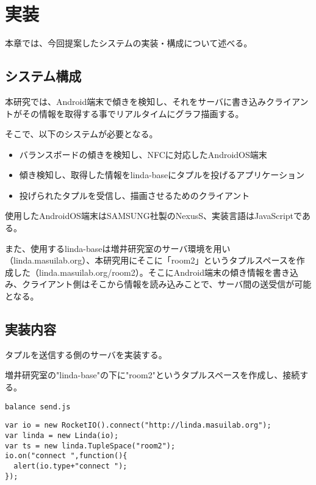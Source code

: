 \chapter{実装}
\label{chap:05}

本章では、今回提案したシステムの実装・構成について述べる。

\section{システム構成}

本研究では、Android端末で傾きを検知し、それをサーバに書き込みクライアントがその情報を取得する事でリアルタイムにグラフ描画する。

そこで、以下のシステムが必要となる。
\begin{itemize}
   \item バランスボードの傾きを検知し、NFCに対応したAndroidOS端末
   \item 傾き検知し、取得した情報をlinda-baseにタプルを投げるアプリケーション
   \item 投げられたタプルを受信し、描画させるためのクライアント
\end{itemize}

使用したAndroidOS端末はSAMSUNG社製のNexusS、実装言語はJavaScriptである。

また、使用するlinda-baseは増井研究室のサーバ環境を用い（linda.masuilab.org）、本研究用にそこに「room2」というタプルスペースを作成した（linda.masuilab.org/room2）。そこにAndroid端末の傾き情報を書き込み、クライアント側はそこから情報を読み込みことで、サーバ間の送受信が可能となる。


\section{実装内容}

タプルを送信する側のサーバを実装する。

増井研究室の"linda-base"の下に"room2"というタプルスペースを作成し、接続する。


\begin{itembox}[l]{{\tt balance send.js}}
\begin{verbatim}
var io = new RocketIO().connect("http://linda.masuilab.org");
var linda = new Linda(io);
var ts = new linda.TupleSpace("room2");
io.on("connect ",function(){
  alert(io.type+"connect ");
});  
\end{verbatim}
\end{itembox}



